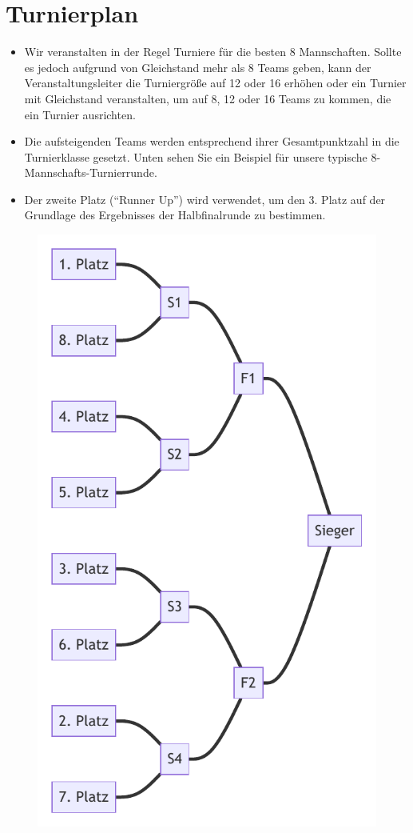 \documentclass[a4paper,12pt]{article}
\begin{document}
\section{Turnierplan}
\begin{itemize}
	\item Wir veranstalten in der Regel Turniere für die besten 8
		Mannschaften. Sollte es jedoch aufgrund von Gleichstand mehr
		als 8 Teams geben, kann der Veranstaltungsleiter die
		Turniergröße auf 12 oder 16 erhöhen oder ein Turnier mit
		Gleichstand veranstalten, um auf 8, 12 oder 16 Teams zu kommen,
		die ein Turnier ausrichten.
	\item Die aufsteigenden Teams werden entsprechend ihrer Gesamtpunktzahl
		in die Turnierklasse gesetzt. Unten sehen Sie ein Beispiel für
		unsere typische 8-Mannschafts-Turnierrunde.
	\item Der zweite Platz ("`Runner Up"') wird verwendet, um den 3. Platz
		auf der Grundlage des Ergebnisses der Halbfinalrunde zu
		bestimmen.
\end{itemize}
\begin{figure}[H]
	\centering
	\def\svgwidth{\columnwidth}
	\includegraphics{tournament_score/tournament_score.pdf}
\end{figure}
\end{document}
